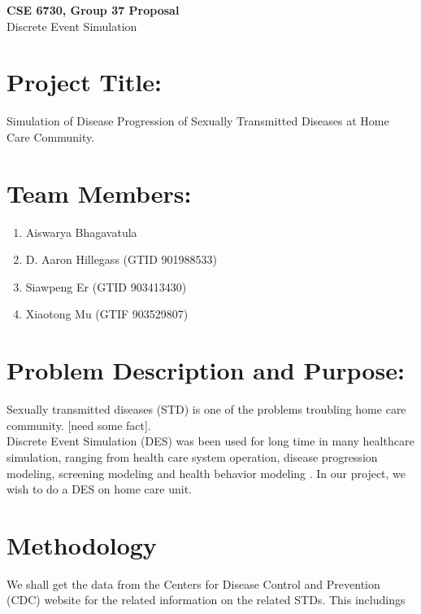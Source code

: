 \documentclass{article}
\begin{document}
	\begin{center}
    
		\LARGE{\textbf{CSE 6730, Group 37 Proposal}} \\
        \vspace{1em}
        \Large{Discrete Event Simulation} \\
     
	\end{center}
    \begin{normalsize}
    
    	\section{Project Title:}
        
Simulation of Disease Progression of Sexually Transmitted Diseases at Home Care Community.
      
		\section{Team Members:}
        
      \begin{enumerate}
      	\item Aiswarya Bhagavatula
      	\item D. Aaron Hillegass (GTID 901988533)
      	\item Siawpeng Er (GTID 903413430)
      	\item Xiaotong Mu (GTIF 903529807)
      \end{enumerate}
        
	   	\section{Problem Description and Purpose:}
        
    Sexually transmitted diseases (STD) is one of the problems troubling home care community. [need some fact].\\
    
    Discrete Event Simulation (DES) was been used for long time in many healthcare simulation, ranging from health care system operation, disease progression modeling, screening modeling and health behavior modeling \cite{lebcir2017, Zhang2018}.  In our project, we wish to do a DES on home care unit. 
        
    \section{Methodology}
    We shall get the data from the Centers for Disease Control and Prevention (CDC) website for the related information on the related STDs. This includings 
    

\end{normalsize}
\end{document}
